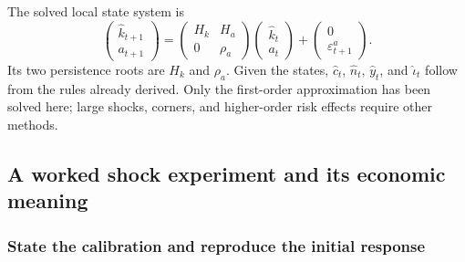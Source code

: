 The solved local state system is
\begin{equation}\label{eq:rbc-state-rule}
\begin{pmatrix}\hat k_{t+1}\\a_{t+1}\end{pmatrix}
 =\begin{pmatrix}H_k&H_a\\0&\rho_a\end{pmatrix}
  \begin{pmatrix}\hat k_t\\a_t\end{pmatrix}
 +\begin{pmatrix}0\\\varepsilon_{t+1}^a\end{pmatrix}.
\end{equation}
Its two persistence roots are $H_k$ and $\rho_a$. Given the states,
$\hat c_t$, $\hat n_t$, $\hat y_t$, and $\hat\iota_t$ follow from the rules
already derived. Only the first-order approximation has been solved here;
large shocks, corners, and higher-order risk effects require other methods.

\subsection{A worked shock experiment and its economic meaning}\label{sec:rbc-experiment}

\subsubsection{State the calibration and reproduce the initial response}

